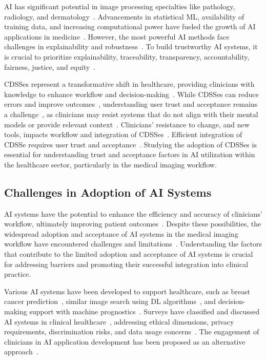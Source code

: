 \ac{AI} has significant potential in image processing specialties like pathology, radiology, and dermatology~\cite{EVANS2022281, MULLER202267}.
Advancements in statistical \ac{ML}, availability of training data, and increasing computational power have fueled the growth of \ac{AI} applications in medicine~\cite{10.1145/3399715.3399744}.
However, the most powerful \ac{AI} methods face challenges in explainability and robustness~\cite{CALISTO2022102285}.
To build trustworthy \ac{AI} systems, it is crucial to prioritize explainability, traceability, transparency, accountability, fairness, justice, and equity~\cite{9473208}.

\acp{CDSSe} represent a transformative shift in healthcare, providing clinicians with knowledge to enhance workflow and decision-making~\cite{10.1145/3290605.3300234}.
While \acp{CDSSe} can reduce errors and improve outcomes~\cite{10.1145/3290605.3300234}, understanding user trust and acceptance remains a challenge~\cite{Cai:2019:EEE:3301275.3302289}, as clinicians may resist systems that do not align with their mental models or provide relevant context~\cite{CALISTO2021102607}.
Clinicians' resistance to change, and new tools, impacts workflow and integration of \acp{CDSSe}~\cite{10.1145/3132272.3134111}.
Efficient integration of \ac{CDSSe} requires user trust and acceptance~\cite{jia2016effects}.
Studying the adoption of \acp{CDSSe} is essential for understanding trust and acceptance factors in \ac{AI} utilization within the healthcare sector, particularly in the medical imaging workflow.

\subsection{Challenges in Adoption of AI Systems}
\label{sec:chap004002002}

\ac{AI} systems have the potential to enhance the efficiency and accuracy of clinicians' workflow, ultimately improving patient outcomes~\cite{wallis2019artificial}.
Despite these possibilities, the widespread adoption and acceptance of \ac{AI} systems in the medical imaging workflow have encountered challenges and limitations~\cite{CALISTO2022102922}.
Understanding the factors that contribute to the limited adoption and acceptance of \ac{AI} systems is crucial for addressing barriers and promoting their successful integration into clinical practice.

Various \ac{AI} systems have been developed to support healthcare, such as breast cancer prediction~\cite{McKinney2020}, similar image search using \ac{DL} algorithms~\cite{10.1145/3290605.3300234}, and decision-making support with machine prognostics~\cite{10.1145/3290605.3300468}.
Surveys have classified and discussed \ac{AI} systems in clinical healthcare~\cite{PELAU2021106855, STADIN2021106486}, addressing ethical dimensions, privacy requirements, discrimination risks, and data usage concerns~\cite{DEANGELI2020102412}.
The engagement of clinicians in \ac{AI} application development has been proposed as an alternative approach~\cite{10.1145/3290605.3300234, CALISTO2021102607}.

